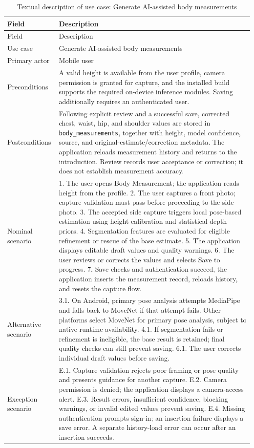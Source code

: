 \documentclass[12pt,a4paper,openany]{report}
\begin{document}
\begingroup
\footnotesize
\setlength{\tabcolsep}{3pt}
\renewcommand{\arraystretch}{1.20}
\setlength{\LTpre}{5pt}
\setlength{\LTpost}{10pt}
\begin{longtable}{|L{4.95cm}|L{10.05cm}|}
\caption{Textual description of use case: Generate AI-assisted body measurements}\label{tab:pdf-50-23} \\
\hline
{}
Field & Description \\ \hline
\endfirsthead
\hline
{}
Field & Description \\ \hline
\endhead
Use case & Generate AI-assisted body measurements \\ \hline
Primary actor & Mobile user \\ \hline
Preconditions & A valid height is available from the user profile, camera permission is granted for capture, and the installed build supports the required on-device inference modules. Saving additionally requires an authenticated user. \\ \hline
Postconditions & Following explicit review and a successful save, corrected chest, waist, hip, and shoulder values are stored in \texttt{body\_measurements}, together with height, model confidence, source, and original-estimate/correction metadata. The application reloads measurement history and returns to the introduction. Review records user acceptance or correction; it does not establish measurement accuracy. \\ \hline
Nominal scenario & 1. The user opens Body Measurement; the application reads height from the profile. 2. The user captures a front photo; capture validation must pass before proceeding to the side photo. 3. The accepted side capture triggers local pose-based estimation using height calibration and statistical depth priors. 4. Segmentation features are evaluated for eligible refinement or rescue of the base estimate. 5. The application displays editable draft values and quality warnings. 6. The user reviews or corrects the values and selects Save to progress. 7. Save checks and authentication succeed, the application inserts the measurement record, reloads history, and resets the capture flow. \\ \hline
Alternative scenario & 3.1. On Android, primary pose analysis attempts MediaPipe and falls back to MoveNet if that attempt fails. Other platforms select MoveNet for primary pose analysis, subject to native-runtime availability. 4.1. If segmentation fails or refinement is ineligible, the base result is retained; final quality checks can still prevent saving. 6.1. The user corrects individual draft values before saving. \\ \hline
Exception scenario & E.1. Capture validation rejects poor framing or pose quality and presents guidance for another capture. E.2. Camera permission is denied; the application displays a camera-access alert. E.3. Result errors, insufficient confidence, blocking warnings, or invalid edited values prevent saving. E.4. Missing authentication prompts sign-in; an insertion failure displays a save error. A separate history-load error can occur after an insertion succeeds. \\ \hline
\end{longtable}
\endgroup
\end{document}
